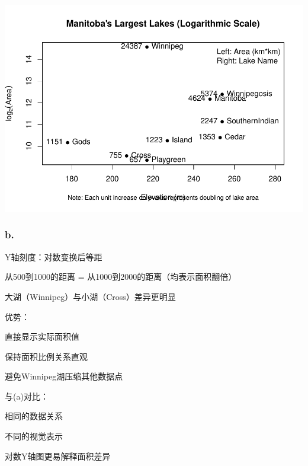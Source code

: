 \documentclass[
]{article}
\begin{document}
\includegraphics{3220103606-homework1_files/figure-latex/unnamed-chunk-15-1.pdf}

\subsubsection{b.}\label{b.-4}

Y轴刻度：对数变换后等距

从500到1000的距离 = 从1000到2000的距离（均表示面积翻倍）

大湖（Winnipeg）与小湖（Cross）差异更明显

优势：

直接显示实际面积值

保持面积比例关系直观

避免Winnipeg湖压缩其他数据点

与(a)对比：

相同的数据关系

不同的视觉表示

对数Y轴图更易解释面积差异
\end{document}
